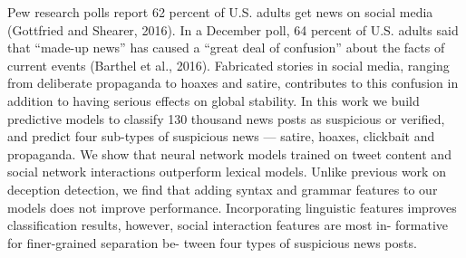Pew research polls report 62 percent of U.S. adults get news on social media (Gottfried and Shearer, 2016). In a December poll, 64 percent of U.S. adults said that ``made-up news'' has caused a ``great deal of confusion'' about the facts of current events (Barthel et al., 2016). Fabricated stories in social media, ranging from deliberate propaganda to hoaxes and satire, contributes to this confusion in addition to having serious effects on global stability. In this work we build predictive models to classify 130 thousand news posts as suspicious or verified, and predict four sub-types of suspicious news --- satire, hoaxes, clickbait and propaganda. We show that neural network models trained on tweet content and social network interactions outperform lexical models. Unlike previous work on deception detection, we find that adding syntax and grammar features to our models does not improve performance. Incorporating linguistic features improves classification results, however, social interaction features are most in- formative for finer-grained separation be- tween four types of suspicious news posts.
